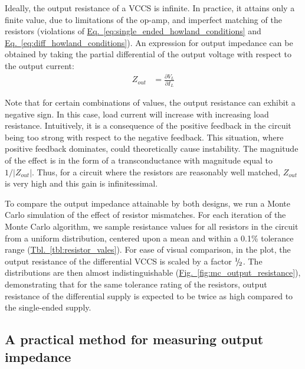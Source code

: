 \documentclass[conference]{IEEEtran}
\newcommand{\briefeqlink}[1]{\hyperref[#1]{Eq.~\ref*{#1}}\xspace }
\newcommand{\tablelink}[1]{\hyperref[#1]{Tbl.~\ref*{#1}}\xspace }
\newcommand{\brieffiglink}[1]{\hyperref[#1]{Fig.~\ref*{#1}}}
\newcommand{\vulgaronehalf}{${}^1\!\!\mskip0.3\thinmuskip/\!{}_2$}
\begin{document}
Ideally, the output resistance of a VCCS is infinite. In practice, it attains only a finite value, due to limitations of the op-amp, and imperfect matching of the resistors (violations of \briefeqlink{eq:single_ended_howland_conditions} and \briefeqlink{eq:diff_howland_conditions}). An expression for output impedance can be obtained by taking the partial differential of the output voltage with respect to the output current:
\begin{align}
\label{eq:zout}
Z_{out} &= \frac{\partial V_L}{\partial{}I_L}
\end{align}

Note that for certain combinations of values, the output resistance can exhibit a negative sign. In this case, load current will increase with increasing load resistance. Intuitively, it is a consequence of the positive feedback in the circuit being too strong with respect to the negative feedback. This situation, where positive feedback dominates, could theoretically cause instability. The magnitude of the effect is in the form of a transconductance with magnitude equal to $1/|Z_{out}|$. Thus, for a circuit where the resistors are reasonably well matched, $Z_{out}$ is very high and this gain is infinitessimal.

To compare the output impedance attainable by both designs, we run a Monte Carlo simulation of the effect of resistor mismatches. For each iteration of the Monte Carlo algorithm, we sample resistance values for all resistors in the circuit from a uniform distribution, centered upon a mean and within a 0.1\% tolerance range (\tablelink{tbl:resistor_vales}). For ease of visual comparison, in the plot, the output resistance of the differential VCCS is scaled by a factor \vulgaronehalf. The distributions are then almost indistinguishable (\brieffiglink{fig:mc_output_resistance}), demonstrating that for the same tolerance rating of the resistors, output resistance of the differential supply is expected to be twice as high compared to the single-ended supply.


\subsection{A practical method for measuring output impedance}
\label{sec:output_impedance_measurement}
\end{document}

